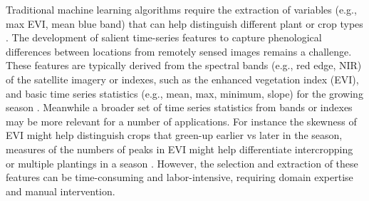 \documentclass[
  journal,
  twocolumn]{IEEEtran}
\begin{document}
Traditional machine learning algorithms require the extraction of
variables (e.g., max EVI, mean blue band) that can help distinguish
different plant or crop types \citep{begue2018remote}. The development
of salient time-series features to capture phenological differences
between locations from remotely sensed images remains a challenge. These
features are typically derived from the spectral bands (e.g., red edge,
NIR) of the satellite imagery or indexes, such as the enhanced
vegetation index (EVI), and basic time series statistics (e.g., mean,
max, minimum, slope) for the growing season \citep{morton2006cropland}.
Meanwhile a broader set of time series statistics from bands or indexes
may be more relevant for a number of applications. For instance the
skewness of EVI might help distinguish crops that green-up earlier vs
later in the season, measures of the numbers of peaks in EVI might help
differentiate intercropping or multiple plantings in a season
\citep{begue2018remote}. However, the selection and extraction of these
features can be time-consuming and labor-intensive, requiring domain
expertise and manual intervention.
\end{document}
